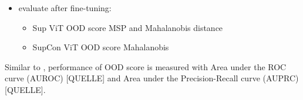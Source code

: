 \begin{itemize}
\begin{itemize}
		\item evaluate after fine-tuning: 
		\begin{itemize}
			\item Sup ViT OOD score MSP and Mahalanobis distance
			\item SupCon ViT OOD score Mahalanobis
		\end{itemize}
	\end{itemize}
	Similar to \citep{Berger2021, Cao2020}, performance of OOD score is measured with Area under the ROC curve (AUROC) [QUELLE] and Area under the Precision-Recall curve (AUPRC) [QUELLE].
\end{itemize}


